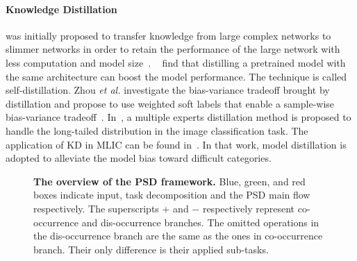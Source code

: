 \documentclass{article}
\begin{document}
\paragraph{Knowledge Distillation} was initially proposed to transfer knowledge from large complex networks to slimmer networks in order to retain the performance of the large network with less computation and model size~\cite{hinton2015distilling}.
~\cite{zhang2019your} find that distilling a pretrained model with the same architecture can boost the model performance.
The technique is called self-distillation.
Zhou \emph{et al.} investigate the bias-variance tradeoff brought by distillation and propose to use weighted soft labels that enable a sample-wise bias-variance tradeoff~\cite{zhou2021rethinking}.
In~\cite{xiang2020learning}, a multiple experts distillation method is proposed to handle the long-tailed distribution in the image classification task.
The application of KD in MLIC can be found in~\cite{song2021handling}. In that work, model distillation is adopted to alleviate the model bias toward difficult categories.

\begin{figure}[t]
    \centering
    \vspace{-0.2cm}
    \vspace{-0.3cm}
    \caption{\textbf{The overview of the PSD framework.}
    Blue, green, and red boxes indicate input, task decomposition and the PSD main flow respectively.
    The superscripts \emph{$+$} and \emph{$-$} respectively represent co-occurrence and dis-occurrence branches.
    The omitted operations in the dis-occurrence branch are the same as the ones in co-occurrence branch. Their only difference is their applied sub-tasks.
    }
    \label{fig2}
    \vspace{-0.5cm}
\end{figure}
\end{document}
